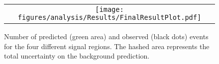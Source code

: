 


\begin{figure}[!b]
  \centering 
  \begin{tabular}{c}
    \texttt{[image: figures/analysis/Results/FinalResultPlot.pdf]} 
  \end{tabular}
  \caption{Number of predicted (green area) and observed (black dots) events for the four different signal regions. The hashed area represents the total uncertainty on the background prediction.}
  \label{fig:FinalResult}
\end{figure} 

